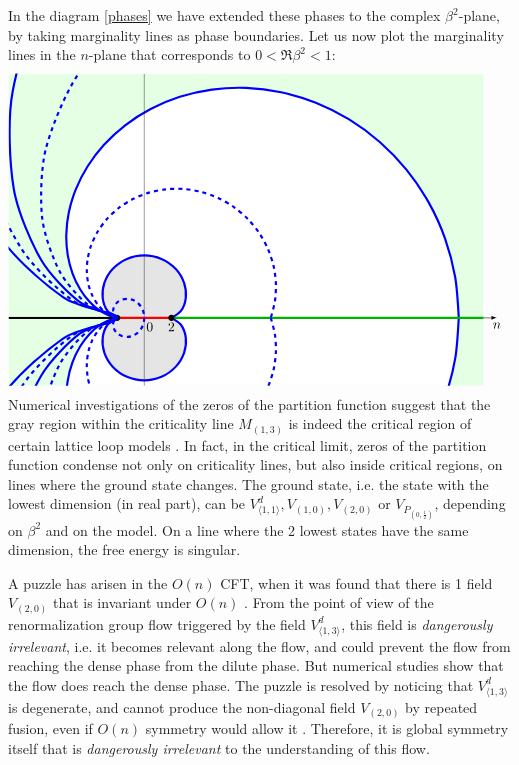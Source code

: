 \documentclass[12pt, a4paper]{article}
\begin{document}
In the diagram \eqref{phases} we have extended these phases to the complex $\beta^2$-plane, by taking marginality lines as phase boundaries. Let us now plot the marginality lines in the $n$-plane that corresponds to $0<\Re \beta^2<1$:
\newcommand{\margs}[2]{
\draw[domain = {-2/(#1-1)}:{2/(#1-1)}, smooth, variable = \t, #2]
plot({-2*cos(pi/2*(#1-1)*\t r)*cosh(pi/2*(#1-1)*sqrt(abs(\t)-\t*\t)}, {2*sin(pi/2*(#1-1)*\t r)*sinh(pi/2*(#1-1)*sqrt(abs(\t)-\t*\t)});
}
\begin{align}
 \begin{tikzpicture}[baseline=(current  bounding  box.center), scale = .35]
\clip (-10, 18) -- (27, 18) -- (27, -5) -- (-10, -5) -- cycle;
\fill [color = green!10] (-10, 18) -- (25, 18) -- (25, -5) -- (-10, -5) -- cycle;
\margs{5}{ultra thick, blue, samples = 50, fill = white}
\margs{3}{ultra thick, blue, fill = black!10}
\draw[-latex] (-10, 0) -- (26, 0) node[below]{$n$};
\draw (0, -5) -- (0, 18);
\draw[ultra thick, green!70!black] (2, 0) -- (25, 0);
\draw [ultra thick] (-10, 0) -- (-2, 0);
\draw [ultra thick, red] (-2, 0) -- (2, 0); 
\node[below right] at (-.2, 0) {$0$};
\node[below] at (2, 0) {$2$};
\node at (2, 0) [fill, circle, scale = .5] {};
\node at (-2, 0) [fill, circle, scale = .5] {};
 \draw[domain = 0:360, smooth, variable = \t, samples = 30, ultra thick, dashed, blue]
   plot({-2*sin(pi*(1+cos(\t))/4 r)*cosh(pi*sin(\t)/4)}, {2*cos(pi*(1+cos(\t))/4 r)*sinh(pi*sin(\t)/4)});
 \margs{4}{ultra thick, dashed, blue, samples = 50}
\margs{6}{ultra thick, dashed, blue}
\margs{7}{ultra thick, blue}
\margs{8}{ultra thick, dashed, blue}
\margs{9}{ultra thick, blue}
\end{tikzpicture}
\end{align}
Numerical investigations of the zeros of the partition function suggest that the gray region within the criticality line $M_{(1,3)}$ is indeed the critical region of certain lattice loop models \cite{bjjz22}. 
In fact, in the critical limit, zeros of the partition function condense not only on criticality lines, but also inside critical regions, on lines where the ground state changes. The ground state, i.e. the state with the lowest dimension (in real part), can be $V^d_{\langle 1,1\rangle}, V_{(1, 0)}, V_{(2,0)}$ or $V_{P_{(0,\frac12)}}$, depending on $\beta^2$ and on the model. On a line where the 2 lowest states have the same dimension, the free energy is singular. 

A puzzle has arisen in the $O(n)$ CFT, when it was found that there is 1 field $V_{(2,0)}$ that is invariant under $O(n)$ \cite{gz20}. From the point of view of the renormalization group flow triggered by the field $V^d_{\langle 1,3\rangle}$, this field is \textit{dangerously irrelevant}, i.e. it becomes relevant along the flow, and could prevent the flow from reaching the dense phase from the dilute phase. But numerical studies show that the flow does reach the dense phase. The puzzle is resolved by noticing that $V^d_{\langle 1,3\rangle}$ is degenerate, and cannot produce the non-diagonal field $V_{(2,0)}$ by repeated fusion, even if $O(n)$ symmetry would allow it \cite{js23}. Therefore, it is global symmetry itself that is \textit{dangerously irrelevant} to the understanding of this flow. 
\end{document}
